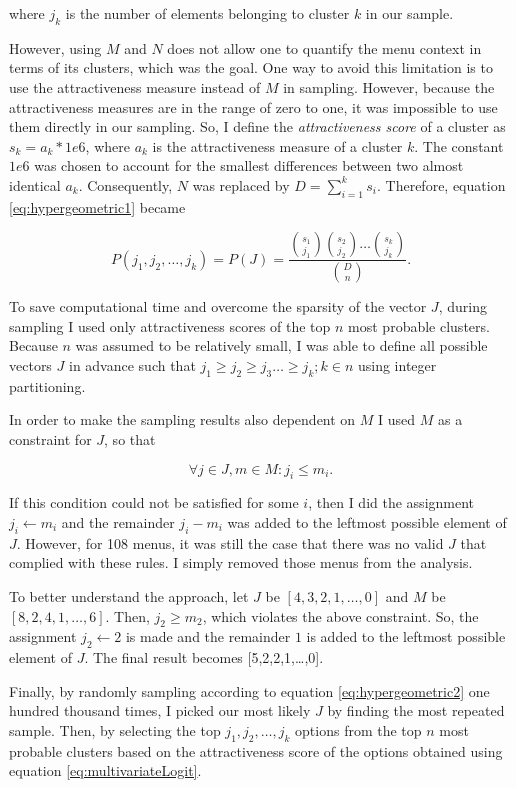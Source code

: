 \documentclass[a4paper,12pt]{article}
\begin{document}
where $j_k$ is the number of elements belonging to cluster $k$ in our sample. 
 
However, using $M$ and $N$ does not allow one to quantify the menu context in terms of its clusters, which was the goal. One way to avoid this limitation is to use the attractiveness measure instead of $M$ in sampling. However, because the attractiveness measures are in the range of zero to one, it was impossible to use them directly in our sampling. So, I define the \textit{ attractiveness score} of a cluster as $s_k = a_k \ast 1e6$, where $a_k$ is the attractiveness measure of a cluster $k$. The constant $1e6$ was chosen to account for the smallest differences between two almost identical $a_k$. Consequently, $N$ was replaced by $D=\sum_{i=1}^{k}s_i$. Therefore, equation \ref{eq:hypergeometric1} became

\begin{equation}\label{eq:hypergeometric2}
    P(j_1, j_2,\ldots, j_k) = P(J) =\frac{{s_1\choose j_1} {s_2\choose j_2} \dots {s_k\choose j_k}}{{D\choose n}}.
\end{equation}

To save computational time and overcome the sparsity of the vector $J$, during sampling I used only attractiveness scores of the top $n$ most probable clusters. Because $n$ was assumed to be relatively small, I was able to define all possible vectors $J$ in advance such that $j_1\geq j_2\geq j_3\ldots\geq j_k; k \in n$ using integer partitioning.

In order to make the sampling results also dependent on $M$ I used $M$ as a constraint for $J$, so that 

$$ \forall j \in J,m \in M: j_i\le m_i.$$

If this condition could not be satisfied for some $i$, then I did the assignment ${j_i\gets m_i}$ and the remainder $j_i-m_i$ was added to the leftmost possible element of $J$.  However, for 108 menus, it was still the case that there was no valid $J$ that complied with these rules. I simply removed those menus from the analysis. 

To better understand the approach, let $J$ be $[4, 3, 2, 1,\ldots,0]$ and $M$ be $[8, 2, 4, 1,\dots, 6]$. Then, $j_2\geq m_2$, which violates the above constraint. So, the assignment $j_2\gets2$ is made and the remainder $1$ is added to the leftmost possible element of $J$. The final result becomes [5,2,2,1,\ldots,0].

Finally, by randomly sampling according to equation \ref{eq:hypergeometric2} one hundred thousand times, I picked our most likely $J$ by finding the most repeated sample. Then, by selecting the top $j_1, j_2, \dots, j_k$ options from the top $n$ most probable clusters based on the attractiveness score of the options obtained using equation \ref{eq:multivariateLogit}.
\end{document}

